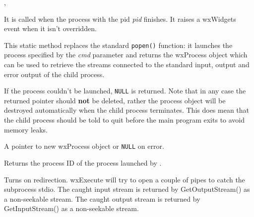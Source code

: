 ,\rtfsp
{}

\label{wxprocessonterminate}


It is called when the process with the pid {\it pid} finishes.
It raises a wxWidgets event when it isn't overridden.



\label{wxprocessopen}


This static method replaces the standard {\tt popen()} function: it launches
the process specified by the {\it cmd} parameter and returns the wxProcess
object which can be used to retrieve the streams connected to the standard
input, output and error output of the child process.

If the process couldn't be launched, {\tt NULL} is returned. Note that in any
case the returned pointer should {\bf not} be deleted, rather the process
object will be destroyed automatically when the child process terminates. This
does mean that the child process should be told to quit before the main program
exits to avoid memory leaks.




A pointer to new wxProcess object or {\tt NULL} on error.



\label{wxprocessgetpid}


Returns the process ID of the process launched by .

\label{wxprocessredirect}


Turns on redirection. wxExecute will try to open a couple of pipes
to catch the subprocess stdio. The caught input stream is returned by
GetOutputStream() as a non-seekable stream. The caught output stream is returned
by GetInputStream() as a non-seekable stream.


